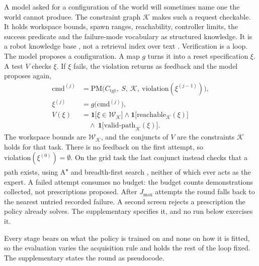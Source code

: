 A model asked for a configuration of the world will sometimes name one the world
cannot produce. The constraint graph $\mathcal{K}$ makes such a request checkable.
It holds workspace bounds, spawn ranges, reachability, controller limits, the
success predicate and the failure-mode vocabulary as structured knowledge. It is a
robot knowledge base \cite{tenorth2013knowrob}, not a retrieval index over text
\cite{lewis2020rag,edge2024graphrag}. Verification is a loop. The model proposes a
configuration. A map $g$ turns it into a reset specification $\xi$. A test $V$
checks $\xi$. If $\xi$ fails, the violation returns as feedback and the model
proposes again,
%
\begin{equation}
\label{eq:verify}
\begin{aligned}
\mathrm{cmd}^{(j)} &= \mathrm{PM}\big(C_{\mathrm{tgt}},\ S,\ \mathcal{K},\
\text{violation}(\xi^{(j-1)})\big),\\[1pt]
\xi^{(j)} &= g\big(\mathrm{cmd}^{(j)}\big),\\[1pt]
V(\xi) &= \mathbf{1}\big[\xi \in \mathcal{W}_{\mathcal{K}}\big] \wedge
\mathbf{1}\big[\mathrm{reachable}_{\mathcal{K}}(\xi)\big]\\[1pt]
&\quad \wedge\ \mathbf{1}\big[\mathrm{valid\text{-}path}_{\mathcal{K}}(\xi)
\big].
\end{aligned}
\end{equation}
%
The workspace bounds are $\mathcal{W}_{\mathcal{K}}$, and the conjuncts of $V$ are
the constraints $\mathcal{K}$ holds for that task. There is no feedback on the
first attempt, so $\text{violation}(\xi^{(0)}) = \emptyset$. On the grid task the
last conjunct instead checks that a path exists, using A\textsuperscript{$\star$}
and breadth-first search \cite{hart1968astar,cormen2022algorithms}, neither of
which ever acts as the expert. A failed attempt consumes no budget: the budget
counts demonstrations collected, not prescriptions proposed. After $J_{\max}$
attempts the round falls back to the nearest untried recorded failure. A second
screen rejects a prescription the policy already solves. The supplementary
specifies it, and no run below exercises it.

Every stage bears on what the policy is trained on and none on how it is fitted,
so the evaluation varies the acquisition rule and holds the rest of the loop fixed.
The supplementary states the round as pseudocode.
